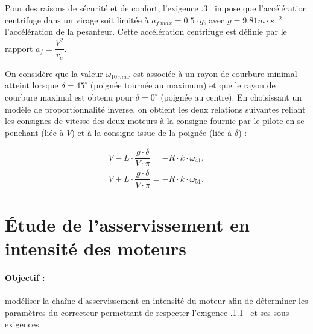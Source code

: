 

Pour des raisons de sécurité et de confort, l'exigence .3 \fg\ impose que l'accélération centrifuge dans un virage soit limitée à $a_{f\ max}=0.5\cdot g$, avec $g=9.81m\cdot s^{-2}$ l'accélération de la pesanteur. Cette accélération centrifuge est définie par le rapport $a_f=\dfrac{V^2}{r_c}$.


On considère que la valeur $\omega_{10\ max}$ est associée à un rayon de courbure minimal atteint lorsque $\delta=45^{\circ}$ (poignée tournée au maximum) et que le rayon de courbure maximal est obtenu pour $\delta=0^{\circ}$ (poignée au centre). En choisissant un modèle de proportionnalité inverse, on obtient les deux relations suivantes reliant les consignes de vitesse des deux moteurs à la consigne fournie par le pilote en se penchant (liée à $V$) et à la consigne issue de la poignée (liée à $\delta$) :

\begin{eqnarray}
V-L\cdot\dfrac{g\cdot\delta}{V\cdot\pi}=-R\cdot k\cdot\omega_{41},\\
V+L\cdot\dfrac{g\cdot\delta}{V\cdot\pi}=-R\cdot k\cdot\omega_{51}.
\end{eqnarray}


\section{Étude de l'asservissement en intensité des moteurs}

\paragraph{Objectif :} modéliser la chaîne d'asservissement en intensité du moteur afin de déterminer les paramètres du correcteur permettant de respecter l'exigence .1.1 \fg\ et ses sous-exigences.

